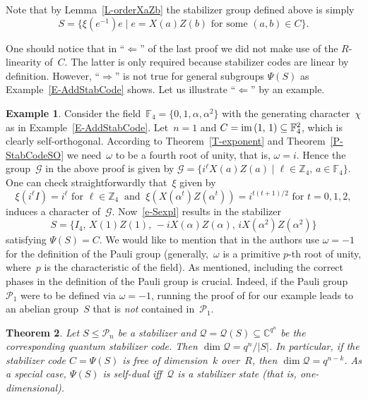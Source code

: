 \documentclass[11pt]{article}
\newtheorem{theo}{Theorem}[section]
\theoremstyle{definition}
\newtheorem{exa}[theo]{Example}
\numberwithin{equation}{section}
\newcommand{\F}{{\mathbb F}}
\newcommand{\Z}{{\mathbb Z}}
\newcommand{\C}{{\mathbb C}}
\newcommand{\cG}{{\mathcal G}}
\newcommand{\cP}{{\mathcal P}}
\newcommand{\cQ}{{\mathcal Q}}
\newcommand{\im}{\mbox{\rm im}\,}
\newcounter{alp}
\newcounter{ara}
\begin{document}
Note that by Lemma~\ref{L-orderXaZb} the stabilizer group defined above is simply
\begin{equation}\label{e-Sexpl}
    S=\{\xi(e^{-1})e\mid e=X(a)Z(b) \text{ for some }(a,b)\in C\}.
\end{equation}

One should notice that in ``$\Leftarrow$'' of the last proof we did not make use of the $R$-linearity of~$C$.
The latter is only required because stabilizer codes are linear by definition.
However, ``$\Rightarrow$'' is not true for general subgroups $\Psi(S)$ as Example~\ref{E-AddStabCode} shows.
Let us illustrate ``$\Leftarrow$'' by an example.

\begin{exa}\label{E-StabSO}
Consider the field~$\F_4=\{0,1,\alpha,\alpha^2\}$ with the generating character~$\chi$ as in Example~\ref{E-AddStabCode}.
Let~$n=1$ and $C=\im(1,\,1)\subseteq\F_4^2$, which is clearly self-orthogonal.
According to Theorem~\ref{T-exponent} and Theorem~\ref{P-StabCodeSO} we need~$\omega$ to be a fourth root of unity, that is, $\omega= i$.
Hence the group~$\cG$ in the above proof is given by
$\cG=\{i^\ell X(a)Z(a)\mid \ell\in\Z_4,\,a\in\F_4\}$.
One can check straightforwardly that~$\xi$ given by
\[
   \xi(i^\ell I)=i^\ell\text{ for }\ell\in\Z_4\ \text{ and }\
   \xi(X(\alpha^t)Z(\alpha^t))=i^{t(t+1)/2}\text{ for }t=0,1,2,
\]
induces a character of~$\cG$.
Now~\eqref{e-Sexpl} results in the stabilizer
\[
    S=\{I_4,\,X(1)Z(1),\,-iX(\alpha)Z(\alpha),\,iX(\alpha^2)Z(\alpha^2)\}
\]
satisfying $\Psi(S)=C$.
We would like to mention that in \cite[Sec.~II.B]{KKKS06} the authors use $\omega = -1$ for the definition of the Pauli group (generally,~$\omega$ is a 
primitive $p$-th root of unity, where~$p$ is the characteristic of the field).
As mentioned, including the correct phases in the definition of the Pauli group is crucial.
Indeed, if the Pauli group~$\cP_1$ were to be defined via $\omega=-1$, running the proof of \cite[Theorem 16]{KKKS06} for our example
leads to an abelian group~$S$ that is \emph{not} contained in~$\cP_1$.
\end{exa}

\begin{theo}\label{T-DimQ}
Let $S\leq\cP_n$ be a stabilizer and $\cQ=\cQ(S)\subseteq\C^{q^n}$ be the corresponding quantum stabilizer code.
Then $\dim\cQ=q^n/|S|$.
In particular, if the stabilizer code $C=\Psi(S)$ is free of dimension~$k$ over~$R$, then $\dim\cQ=q^{n-k}$.
As a special case, $\Psi(S)$ is self-dual iff~$\cQ$ is a stabilizer state (that is, one-dimensional).
\end{theo}
\end{document}
